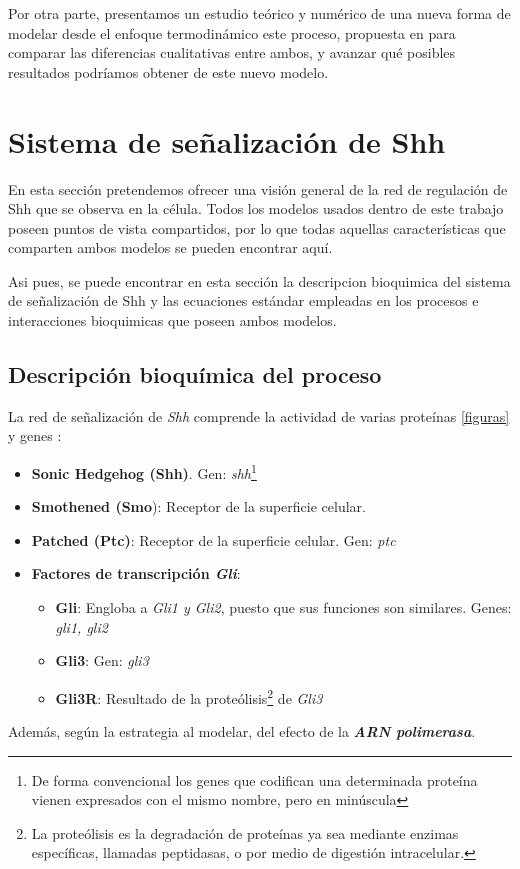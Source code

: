  Por otra parte, presentamos un estudio teórico y numérico de una nueva forma de modelar desde el enfoque termodinámico este proceso, propuesta en \cite{multiple} para comparar las diferencias cualitativas entre ambos, y avanzar qué posibles resultados podríamos obtener de este nuevo modelo. 
 
 
 \section{Sistema de señalización de Shh}
 
 En esta sección pretendemos ofrecer una visión general de la red de regulación de Shh que se observa en la célula. Todos los modelos usados dentro de este trabajo poseen puntos de vista compartidos, por lo que todas aquellas características que comparten ambos modelos se pueden encontrar aquí.
 
 Asi pues, se puede encontrar en esta sección la descripcion bioquimica del sistema de señalización de Shh y las ecuaciones estándar empleadas en los procesos e interacciones bioquimicas que poseen ambos modelos.
 
 \subsection{Descripción bioquímica del proceso}
 
 La red de señalización de \textit{Shh} comprende la actividad de varias proteínas \ref{figuras} y genes :
 \begin{itemize}
 	\item \textbf{Sonic Hedgehog (Shh)}. Gen: \textit{shh}\footnote{ De forma convencional los genes que codifican una determinada proteína vienen expresados con el mismo nombre, pero en minúscula}
 	\item \textbf{Smothened (Smo}): Receptor de la superficie celular.  
 	\item \textbf{Patched (Ptc)}: Receptor de la superficie celular. Gen: \textit{ptc}
 	\item \textbf{Factores de transcripción \textit{Gli}}:
 	\begin{itemize}
 		\item \textbf{Gli}: Engloba a \textit{Gli1 y Gli2}, puesto que sus funciones son similares. Genes: \textit{gli1, gli2}
 		\item \textbf{Gli3}: Gen: \textit{gli3}
 		\item \textbf{Gli3R}: Resultado de la proteólisis\footnote{La proteólisis es la degradación de proteínas ya sea mediante enzimas específicas, llamadas peptidasas, o por medio de digestión intracelular.} de \textit{Gli3}
 	\end{itemize}
 \end{itemize}
  Además, según la estrategia al modelar, del efecto de la \textbf{\textit{ARN polimerasa}}. 
 
